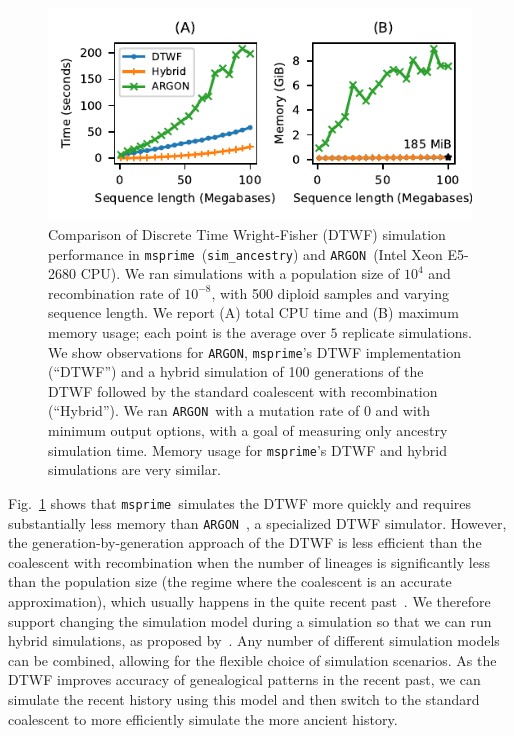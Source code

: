 \documentclass[9pt,twocolumn,twoside,lineno]{gsajnl}
\newcommand{\msprime}[0]{\texttt{msprime}}
\newcommand{\ARGON}[0]{\texttt{ARGON}}
\begin{document}
\begin{figure}
\begin{center}
\includegraphics{figures/dtwf-perf}
\end{center}
\caption{\label{fig-dtwf-perf} Comparison of Discrete Time Wright-Fisher
(DTWF) simulation performance in \msprime\ (\texttt{sim\_ancestry})
and \ARGON\ (Intel Xeon E5-2680 CPU).
We ran simulations with a population size of $10^4$ and
recombination rate of $10^{-8}$, with 500 diploid samples
and varying sequence length.
We report (A) total CPU time and (B) maximum memory usage;
each point is the average over $5$ replicate simulations.
We show observations for \ARGON, \msprime's DTWF implementation (``DTWF'')
and a hybrid simulation of 100 generations of the DTWF followed by
the standard coalescent with recombination (``Hybrid'').
We ran \ARGON\ with a mutation rate of $0$ and with minimum output options,
with a goal of measuring only ancestry simulation time.
Memory usage for \msprime's DTWF and hybrid simulations are very similar.
}
\end{figure}

Fig.~\ref{fig-dtwf-perf} shows that \msprime\ simulates the DTWF
more quickly and requires substantially less memory than
\ARGON~\citep{palamara2016argon}, a specialized DTWF simulator.
However, the generation-by-generation approach of the DTWF is less
efficient than the coalescent with recombination when the
number of lineages is significantly less than the population size
(the regime where the coalescent is an accurate approximation),
which usually happens in the quite recent
past~\citep{bhaskar2014distortion}.
We therefore support changing the simulation model during a simulation
so that we can run hybrid simulations, as proposed by~\cite{bhaskar2014distortion}.
Any number of different simulation models can be combined, allowing for the
flexible choice of simulation scenarios.
As the DTWF improves accuracy of genealogical
patterns in the recent past, we can simulate the recent history using this
model and then switch to the standard coalescent to more efficiently simulate
the more ancient history.
\end{document}
